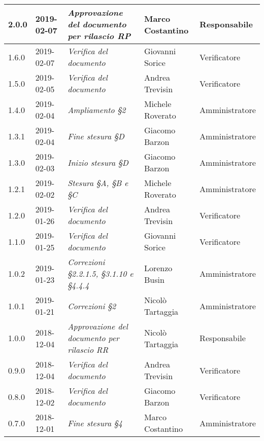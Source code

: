 \begin{longtable}{C{2cm}|C{2.5cm}|C{4.5cm}|C{2.5cm}|C{3cm}}
		2.0.0 & 2019-02-07 & \emph{Approvazione del documento per rilascio RP} & Marco Costantino & Responsabile \\
		\hline
		
		1.6.0 & 2019-02-07 & \emph{Verifica del documento}  & Giovanni Sorice & Verificatore  \\
		\hline
		
		1.5.0 & 2019-02-05 & \emph{Verifica del documento} & Andrea Trevisin & Verificatore  \\
		\hline
		
		1.4.0 & 2019-02-04 & \emph{Ampliamento §2} & Michele Roverato & Amministratore  \\
		\hline
		
		 1.3.1 & 2019-02-04 & \emph{Fine stesura §D} & Giacomo Barzon & Amministratore \\
		\hline
		
		1.3.0 & 2019-02-03 & \emph{Inizio stesura §D} & Giacomo Barzon & Amministratore  \\
		\hline
		
		1.2.1 & 2019-02-02 & \emph{Stesura §A, §B e §C} & Michele Roverato & Amministratore  \\
		\hline
		
		1.2.0 & 2019-01-26 & \emph{Verifica del documento} & Andrea Trevisin & Verificatore  \\
		\hline
		
		1.1.0 & 2019-01-25 & \emph{Verifica del documento} & Giovanni Sorice & Verificatore  \\
		\hline
		
		1.0.2 & 2019-01-23 & \emph{Correzioni §2.2.1.5, §3.1.10 e §4.4.4} & Lorenzo Busin & Amministratore \\
		\hline
		
		1.0.1 & 2019-01-21 & \emph{Correzioni §2} & Nicolò Tartaggia & Amministratore  \\
		\hline
		
		1.0.0  & 2018-12-04 & \emph{Approvazione del documento per rilascio RR} & Nicolò Tartaggia & Responsabile \\
		\hline
		
		0.9.0 & 2018-12-04 &\emph{Verifica del documento} & Andrea Trevisin & Verificatore \\
		\hline
		
	    0.8.0 & 2018-12-02 & \emph{Verifica del documento} & Giacomo Barzon & Verificatore  \\
		\hline
		
		0.7.0 & 2018-12-01 & \emph{Fine stesura §4} & Marco Costantino & Amministratore  \\
		\hline
		

\end{longtable}
